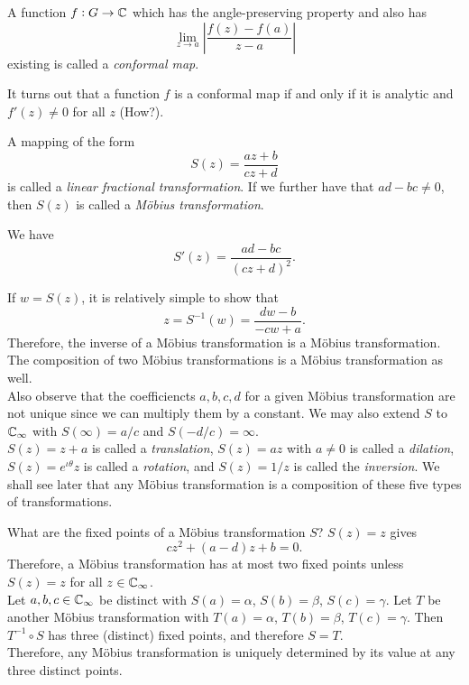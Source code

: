 	\begin{fdef}
		A function $f : G \to \mathbb{C}$ which has the angle-preserving property and also has 
		\[ \lim_{z\to a} \left|\frac{f(z)-f(a)}{z-a}\right| \]
		existing is called a \emph{conformal map}.
	\end{fdef}

	It turns out that a function $f$ is a conformal map if and only if it is analytic and $f'(z) \ne 0$ for all $z$ (How?).

	\begin{fdef}
		A mapping of the form
		\[ S(z) = \frac{az+b}{cz+d} \]
		is called a \emph{linear fractional transformation}. If we further have that $ad-bc \ne 0$, then $S(z)$ is called a \emph{M\"{o}bius transformation}.
	\end{fdef}

	We have
	\[ S'(z) = \frac{ad-bc}{(cz+d)^2}. \]

	If $w = S(z)$, it is relatively simple to show that
	\[ z = S^{-1}(w) = \frac{dw-b}{-cw+a}. \]
	Therefore, the inverse of a M\"{o}bius transformation is a M\"{o}bius transformation. The composition of two M\"{o}bius transformations is a M\"{o}bius transformation as well.\\
	Also observe that the coefficiencts $a,b,c,d$ for a given M\"{o}bius transformation are not unique since we can multiply them by a constant. We may also extend $S$ to $\mathbb{C}_\infty$ with $S(\infty) = a/c$ and $S(-d/c) = \infty$.\\

	$S(z) = z+a$ is called a \emph{translation}, $S(z) = az$ with $a\ne 0$ is called a \emph{dilation}, $S(z) = e^{\iota\theta} z$ is called a \emph{rotation}, and $S(z) = 1/z$ is called the \emph{inversion}. We shall see later that any M\"{o}bius transformation is a composition of these five types of transformations.

	What are the fixed points of a M\"{o}bius transformation $S$? $S(z) = z$ gives
	\[ cz^2 + (a-d)z + b = 0. \]
	Therefore, a M\"{o}bius transformation has at most two fixed points unless $S(z) = z$ for all $z \in \mathbb{C}_\infty$.\\

	Let $a,b,c\in\mathbb{C}_\infty$ be distinct with $S(a) = \alpha$, $S(b) = \beta$, $S(c) = \gamma$. Let $T$ be another M\"{o}bius transformation with $T(a) = \alpha$, $T(b) = \beta$, $T(c) = \gamma$. Then $T^{-1} \circ S$ has three (distinct) fixed points, and therefore $S = T$.\\
	Therefore, any M\"{o}bius transformation is uniquely determined by its value at any three distinct points.\\

